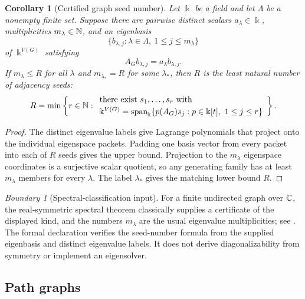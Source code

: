 \documentclass[11pt]{article}
\newtheorem{corollary}[corollary]{Corollary}
\theoremstyle{definition}
\theoremstyle{remark}
\newtheorem{boundary}[boundary]{Boundary}
\theoremstyle{definition}\newtheorem{example}[theorem]{Example}
\newcommand{\bbk}{\Bbbk}
\newcommand{\Span}{\operatorname{span}}
\begin{document}
\begin{corollary}[Certified graph seed number]
\label{cor:graph-rank}
Let $\bbk$ be a field and let $\Lambda$ be a nonempty finite set.  Suppose
there are pairwise distinct scalars $a_{\lambda}\in\bbk$, multiplicities
$m_{\lambda}\in\mathbb N$, and an eigenbasis
\[
\{b_{\lambda,j}:\lambda\in\Lambda,\ 1\le j\le m_{\lambda}\}
\]
of $\bbk^{V(G)}$ satisfying
\[
A_Gb_{\lambda,j}=a_{\lambda}b_{\lambda,j}.
\]
If $m_{\lambda}\le R$ for all $\lambda$ and
$m_{\lambda_*}=R$ for some $\lambda_*$, then $R$ is the least natural number
of adjacency seeds:
\[
{
R=\min\left\{r\in\N:
\begin{array}{l}
\text{there exist }s_1,\ldots,s_r\text{ with}\\[2pt]
\bbk^{V(G)}=\Span_{\bbk}
  \{p(A_G)s_j:p\in\bbk[t],\ 1\le j\le r\}
\end{array}
\right\}.
}
\]
\end{corollary}

\begin{proof}
The distinct eigenvalue labels give Lagrange polynomials that project onto
the individual eigenspace packets.  Padding one basis vector from every
packet into each of $R$ seeds gives the upper bound.  Projection to the
$m_{\lambda}$ eigenspace coordinates is a surjective scalar quotient, so any
generating family has at least $m_{\lambda}$ members for every $\lambda$.
The label $\lambda_*$ gives the matching lower bound $R$.
\end{proof}

\begin{boundary}[Spectral-classification input]
For a finite undirected graph over $\mathbb C$, the real-symmetric spectral theorem
classically supplies a certificate of the displayed kind, and the numbers
$m_{\lambda}$ are the usual eigenvalue multiplicities; see
\cite{brouwerHaemers2012}.  The formal declaration verifies the
seed-number formula from the supplied eigenbasis and distinct eigenvalue
labels.  It does not derive diagonalizability from symmetry or implement an
eigensolver.
\end{boundary}

\subsection{Path graphs}
\end{document}
